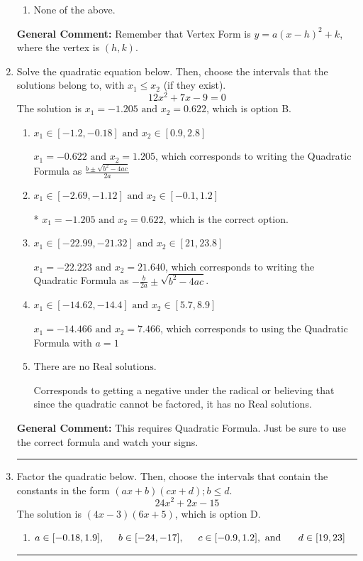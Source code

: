 \documentclass{extbook}[14pt]
\newcommand{\litem}[1]{\item #1

\rule{\textwidth}{0.4pt}}
\begin{document}
\begin{enumerate}
{\begin{enumerate}[label=\Alph*.]
\begin{multicols}{2}
\end{multicols}\item None of the above.\end{enumerate}
\textbf{General Comment:} Remember that Vertex Form is $y = a(x-h)^2+k$, where the vertex is $(h, k)$.
}
\litem{
Solve the quadratic equation below. Then, choose the intervals that the solutions belong to, with $x_1 \leq x_2$ (if they exist).
\[ 12x^{2} +7 x -9 = 0 \]The solution is \( x_1 = -1.205 \text{ and } x_2 = 0.622 \), which is option B.\begin{enumerate}[label=\Alph*.]
\item \( x_1 \in [-1.2, -0.18] \text{ and } x_2 \in [0.9, 2.8] \)

 $x_1 = -0.622 \text{ and } x_2 = 1.205$, which corresponds to writing the Quadratic Formula as $\frac{b \pm \sqrt{b^2 - 4ac}}{2a}$
\item \( x_1 \in [-2.69, -1.12] \text{ and } x_2 \in [-0.1, 1.2] \)

* $x_1 = -1.205 \text{ and } x_2 = 0.622$, which is the correct option.
\item \( x_1 \in [-22.99, -21.32] \text{ and } x_2 \in [21, 23.8] \)

 $x_1 = -22.223 \text{ and } x_2 = 21.640$, which corresponds to writing the Quadratic Formula as $-\frac{b}{2a} \pm \sqrt{b^2 - 4ac}$.
\item \( x_1 \in [-14.62, -14.4] \text{ and } x_2 \in [5.7, 8.9] \)

 $x_1 = -14.466 \text{ and } x_2 = 7.466$, which corresponds to using the Quadratic Formula with $a=1$
\item \( \text{There are no Real solutions.} \)

Corresponds to getting a negative under the radical or believing that since the quadratic cannot be factored, it has no Real solutions.
\end{enumerate}

\textbf{General Comment:} This requires Quadratic Formula. Just be sure to use the correct formula and watch your signs.
}
\litem{
Factor the quadratic below. Then, choose the intervals that contain the constants in the form $(ax+b)(cx+d); b \leq d.$
\[ 24x^{2} +2 x -15 \]The solution is \( (4x -3)(6x + 5) \), which is option D.\begin{enumerate}[label=\Alph*.]
\item \( a \in [-0.18, 1.9], \hspace*{5mm} b \in [-24, -17], \hspace*{5mm} c \in [-0.9, 1.2], \text{ and } \hspace*{5mm} d \in [19, 23] \)


\end{enumerate}}
\end{enumerate}
\end{document}
